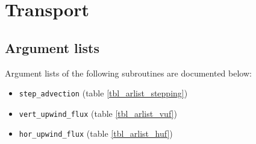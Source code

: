 \chapter{Transport}
\section{Argument lists}
Argument lists of the following subroutines are documented below:
\begin{itemize}
\item \lstinline!step_advection! (table \ref{tbl_arlist_stepping})
\item \lstinline!vert_upwind_flux! (table \ref{tbl_arlist_vuf})
\item \lstinline!hor_upwind_flux! (table \ref{tbl_arlist_huf})
\end{itemize}

